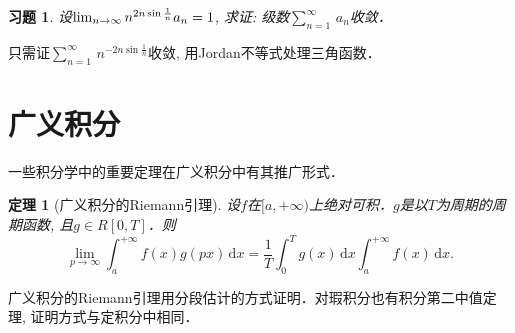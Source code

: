 \documentclass[11pt,a4paper]{ctexart}
\makeatletter
\theoremstyle{thmseries} %
\newtheorem{thm}{定理}[section]
\theoremstyle{exerseries}
\newtheorem{exer}{习题}[section]
\renewenvironment{proof}[1][\proofname]{\par
  \pushQED{\qed}%
  \normalfont \topsep6\p@\@plus6\p@\relax
  \trivlist
  \item[\hskip\labelsep
        \itshape
    #1\@addpunct{}]\ignorespaces
}{%
  \popQED\endtrivlist\@endpefalse
}
\newenvironment{pf}{\begin{proof}[\bfseries\upshape 证\quad]}{\end{proof}}
\newcommand{\bra}[1]{\mathopen{}\left(#1\right)}
\newcommand{\sbra}[1]{\mathopen{}\left[#1\right]}
\renewcommand{\d}{\mathrm{d}}
\def \nti {\mathnormal{n}\to\infty}
\def \tseries {{\textstyle\sum\limits_{n=1}^{\infty}}\,} %
\def \dseries {\sum_{n=1}^{\infty}\,} %
\makeatother
\begin{document}
\begin{exer}
	设$\lim_{\nti}n^{2n\sin\frac{1}{n}}a_n=1$, 求证: 级数$\tseries a_n$收敛．
\end{exer}
\begin{pf}
	只需证$\tseries n^{-2n\sin\frac{1}{n}}$收敛, 用Jordan不等式处理三角函数．
\end{pf}


\section{广义积分}
一些积分学中的重要定理在广义积分中有其推广形式．
\begin{thm}[广义积分的Riemann引理]
	设$f$在$[a,+\infty)$上绝对可积．$g$是以$T$为周期的周期函数, 且$g\in R[0,T]$．则
	\[\lim_{p\to\infty}\int_{a}^{+\infty}f(x)g(px)\,\d x=\frac{1}{T}\int_{0}^{T}g(x)\,\d x\int_{a}^{+\infty}f(x)\,\d x.\]
\end{thm}

广义积分的Riemann引理用分段估计的方式证明．对瑕积分也有积分第二中值定理, 证明方式与定积分中相同．



\end{document}
